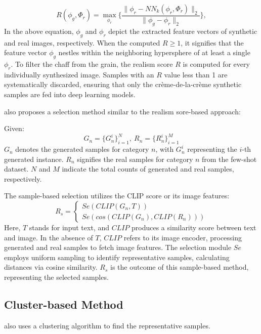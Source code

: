 \documentclass[preprint,12pt,authoryear]{elsarticle}
\begin{document}
\begin{equation} 
\label{eq:r}
    R(\phi_g, \Phi_r) = \max_{\phi_r} \Biggl\{ \frac{\| \phi_r - NN_k (\phi_r, \Phi_r)\|_2}{\| \phi_g - \phi_r\|_2} \Biggl\},
\end{equation}
In the above equation, $\phi_g$ and $\phi_r$ depict the extracted feature vectors of synthetic and real images, respectively. When the computed $R \geq 1$, it signifies that the feature vector $\phi_g$ nestles within the neighboring hypersphere of at least a single $\phi_r$. To filter the chaff from the grain, the realism score $R$ is computed for every individually synthesized image. Samples with an $R$ value less than 1 are systematically discarded, ensuring that only the crème-de-la-crème synthetic samples are fed into deep learning models.

\cite{117_prompt_structure} also proposes a selection method similar to the realism sore-based approach:

Given:
\begin{equation}
G_n=\{G_{n}^{i}\}_{i=1}^{N},\  R_n=\{R_{n}^{i}\}_{i=1}^{M}
\end{equation}
$G_n$ denotes the generated samples for category $n$, with $G_{n}^{i}$ representing the $i$-th generated instance. $R_n$ signifies the real samples for category $n$ from the few-shot dataset. $N$ and $M$ indicate the total counts of generated and real samples, respectively.

The sample-based selection utilizes the CLIP score or its image features:
\begin{equation}
\label{equ:2}
	R_s = \left\{
	\begin{array}{l}
		Se(CLIP(G_n,T)) \\
		Se(cos(CLIP(G_n),CLIP(R_n)))
	\end{array}
	\right.
\end{equation}
Here, $T$ stands for input text, and $CLIP$ produces a similarity score between text and image. In the absence of $T$, $CLIP$ refers to its image encoder, processing generated and real samples to fetch image features. The selection module $Se$ employs uniform sampling to identify representative samples, calculating distances via cosine similarity. $R_s$ is the outcome of this sample-based method, representing the selected samples.

\subsection{Cluster-based Method}
\cite{117_prompt_structure} also uses a clustering algorithm  to find the representative samples. 
\end{document}

